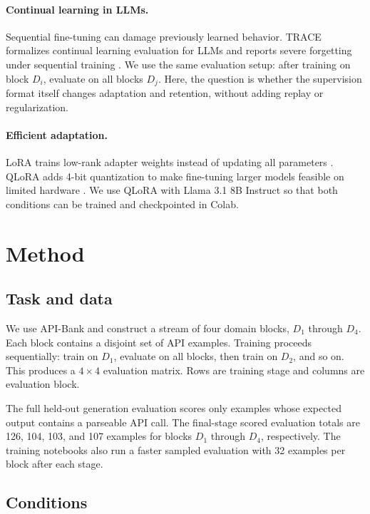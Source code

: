 \documentclass{article}
\begin{document}
\paragraph{Continual learning in LLMs.}
Sequential fine-tuning can damage previously learned behavior. TRACE formalizes continual learning evaluation for LLMs and reports severe forgetting under sequential training \citep{wang2023trace}. We use the same evaluation setup: after training on block $D_i$, evaluate on all blocks $D_j$. Here, the question is whether the supervision format itself changes adaptation and retention, without adding replay or regularization.

\paragraph{Efficient adaptation.}
LoRA trains low-rank adapter weights instead of updating all parameters \citep{hu2022lora}. QLoRA adds 4-bit quantization to make fine-tuning larger models feasible on limited hardware \citep{dettmers2023qlora}. We use QLoRA with Llama 3.1 8B Instruct \citep{dubey2024llama} so that both conditions can be trained and checkpointed in Colab.

\section{Method}

\subsection{Task and data}

We use API-Bank and construct a stream of four domain blocks, $D_1$ through $D_4$. Each block contains a disjoint set of API examples. Training proceeds sequentially: train on $D_1$, evaluate on all blocks, then train on $D_2$, and so on. This produces a $4 \times 4$ evaluation matrix. Rows are training stage and columns are evaluation block.

The full held-out generation evaluation scores only examples whose expected output contains a parseable API call. The final-stage scored evaluation totals are 126, 104, 103, and 107 examples for blocks $D_1$ through $D_4$, respectively. The training notebooks also run a faster sampled evaluation with 32 examples per block after each stage.

\subsection{Conditions}
\end{document}

